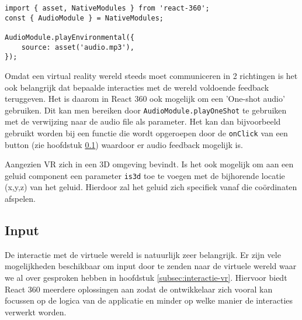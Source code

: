 \begin{lstlisting}[frame=single, caption=Voorbeeld van een Entity component]
import { asset, NativeModules } from 'react-360';
const { AudioModule } = NativeModules;

AudioModule.playEnvironmental({
	source: asset('audio.mp3'),
});
\end{lstlisting}

Omdat een virtual reality wereld steeds moet communiceren in 2 richtingen is het ook belangrijk dat bepaalde interacties met de wereld voldoende feedback teruggeven. Het is daarom in React 360 ook mogelijk om een 'One-shot audio' gebruiken. Dit kan men bereiken door \lstinline[basicstyle=\ttfamily\color{red}]|AudioModule.playOneShot| te gebruiken met de verwijzing naar de audio file als parameter. Het kan dan bijvoorbeeld gebruikt worden bij een functie die wordt opgeroepen door de \lstinline[basicstyle=\ttfamily\color{red}]|onClick| van een button (zie hoofdstuk \ref{subsec:input-vr}) waardoor er audio feedback mogelijk is.

Aangezien VR zich in een 3D omgeving bevindt. Is het ook mogelijk om aan een geluid component een parameter \lstinline[basicstyle=\ttfamily\color{red}]|is3d| toe te voegen met de bijhorende locatie (x,y,z) van het geluid. Hierdoor zal het geluid zich specifiek vanaf die coördinaten afspelen.


\subsection{Input}
\label{subsec:input-vr}
De interactie met de virtuele wereld is natuurlijk zeer belangrijk. Er zijn vele mogelijkheden beschikbaar om input door te zenden naar de virtuele wereld waar we al over gesproken hebben in hoofdstuk \ref{subsec:interactie-vr}. Hiervoor biedt React 360 meerdere oplossingen aan zodat de ontwikkelaar zich vooral kan focussen op de logica van de applicatie en minder op welke manier de interacties verwerkt worden.

